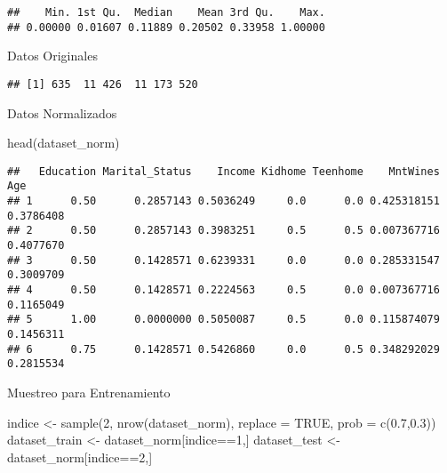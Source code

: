 \documentclass[Iberoamerican Journal of Industrial
Engineering,article,submit,moreauthors,pdftex]{Definitions/mdpi}
\newenvironment{Shaded}{\begin{snugshade}}{\end{snugshade}}
\newcommand{\AttributeTok}[1]{\textcolor[rgb]{0.77,0.63,0.00}{#1}}
\newcommand{\ConstantTok}[1]{\textcolor[rgb]{0.00,0.00,0.00}{#1}}
\newcommand{\DecValTok}[1]{\textcolor[rgb]{0.00,0.00,0.81}{#1}}
\newcommand{\FloatTok}[1]{\textcolor[rgb]{0.00,0.00,0.81}{#1}}
\newcommand{\FunctionTok}[1]{\textcolor[rgb]{0.00,0.00,0.00}{#1}}
\newcommand{\NormalTok}[1]{#1}
\newcommand{\OtherTok}[1]{\textcolor[rgb]{0.56,0.35,0.01}{#1}}
\newcommand{\SpecialCharTok}[1]{\textcolor[rgb]{0.00,0.00,0.00}{#1}}
\begin{document}
\begin{verbatim}
##    Min. 1st Qu.  Median    Mean 3rd Qu.    Max. 
## 0.00000 0.01607 0.11889 0.20502 0.33958 1.00000
\end{verbatim}

Datos Originales

\begin{Shaded}
\end{Shaded}

\begin{verbatim}
## [1] 635  11 426  11 173 520
\end{verbatim}

Datos Normalizados

\begin{Shaded}
\begin{Highlighting}[]
\FunctionTok{head}\NormalTok{(dataset\_norm)}
\end{Highlighting}
\end{Shaded}

\begin{verbatim}
##   Education Marital_Status    Income Kidhome Teenhome    MntWines       Age
## 1      0.50      0.2857143 0.5036249     0.0      0.0 0.425318151 0.3786408
## 2      0.50      0.2857143 0.3983251     0.5      0.5 0.007367716 0.4077670
## 3      0.50      0.1428571 0.6239331     0.0      0.0 0.285331547 0.3009709
## 4      0.50      0.1428571 0.2224563     0.5      0.0 0.007367716 0.1165049
## 5      1.00      0.0000000 0.5050087     0.5      0.0 0.115874079 0.1456311
## 6      0.75      0.1428571 0.5426860     0.0      0.5 0.348292029 0.2815534
\end{verbatim}

Muestreo para Entrenamiento

\begin{Shaded}
\begin{Highlighting}[]
\NormalTok{indice }\OtherTok{\textless{}{-}} \FunctionTok{sample}\NormalTok{(}\DecValTok{2}\NormalTok{, }\FunctionTok{nrow}\NormalTok{(dataset\_norm), }\AttributeTok{replace =} \ConstantTok{TRUE}\NormalTok{, }\AttributeTok{prob =} \FunctionTok{c}\NormalTok{(}\FloatTok{0.7}\NormalTok{,}\FloatTok{0.3}\NormalTok{))}
\NormalTok{dataset\_train }\OtherTok{\textless{}{-}}\NormalTok{ dataset\_norm[indice}\SpecialCharTok{==}\DecValTok{1}\NormalTok{,]}
\NormalTok{dataset\_test  }\OtherTok{\textless{}{-}}\NormalTok{ dataset\_norm[indice}\SpecialCharTok{==}\DecValTok{2}\NormalTok{,]}
\end{Highlighting}
\end{Shaded}
\end{document}
